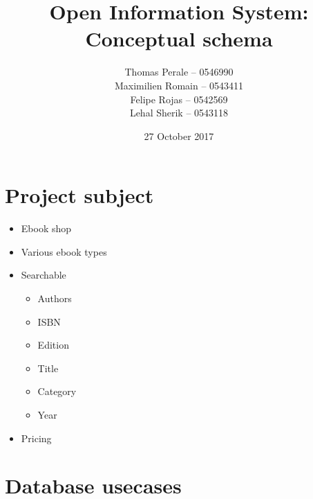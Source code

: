 \documentclass[a4paper,11pt]{article}
\begin{document}
\title{Open Information System: Conceptual schema}
\author{Thomas Perale -- 0546990\\Maximilien Romain -- 0543411\\Felipe Rojas -- 0542569\\Lehal Sherik -- 0543118}
\date{27 October 2017}

\maketitle

\section{Project subject}

\begin{itemize}
  \item Ebook shop
  \item Various ebook types
  \item Searchable
  \begin{itemize}
    \item Authors
    \item ISBN
    \item Edition
    \item Title
    \item Category
    \item Year
  \end{itemize}
  \item Pricing
\end{itemize}

\section{Database usecases}
\end{document}
